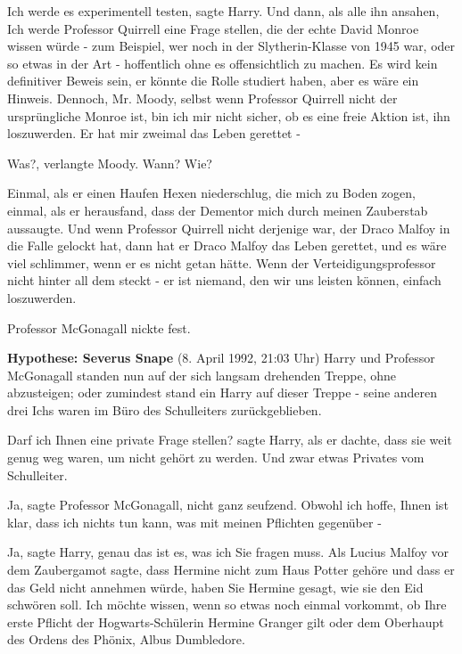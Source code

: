 \glqq{}Ich werde es experimentell testen\grqq{}, sagte Harry. Und dann, als alle
ihn ansahen, \glqq{}Ich werde Professor Quirrell eine Frage stellen, die der
echte David Monroe wissen würde - zum Beispiel, wer noch in der Slytherin-Klasse
von 1945 war, oder so etwas in der Art - hoffentlich ohne es offensichtlich zu
machen. Es wird kein definitiver Beweis sein, er könnte die Rolle studiert
haben, aber es wäre ein Hinweis. Dennoch, Mr. Moody, selbst wenn Professor
Quirrell nicht der ursprüngliche Monroe ist, bin ich mir nicht sicher, ob es
eine freie Aktion ist, ihn loszuwerden. Er hat mir zweimal das Leben gerettet
-\grqq{}

\glqq{}Was?\grqq{}, verlangte Moody. \glqq{}Wann? Wie?\grqq{}

\glqq{}Einmal, als er einen Haufen Hexen niederschlug, die mich zu Boden zogen,
einmal, als er herausfand, dass der Dementor mich durch meinen Zauberstab
aussaugte. Und wenn Professor Quirrell nicht derjenige war, der Draco Malfoy in
die Falle gelockt hat, dann hat er Draco Malfoy das Leben gerettet, und es wäre
viel schlimmer, wenn er es nicht getan hätte. Wenn der Verteidigungsprofessor
nicht hinter all dem steckt - er ist niemand, den wir uns leisten können,
einfach loszuwerden.\grqq{}

Professor McGonagall nickte fest.

\textbf{Hypothese: Severus Snape} (8. April 1992, 21:03 Uhr) Harry und Professor
McGonagall standen nun auf der sich langsam drehenden Treppe, ohne abzusteigen;
oder zumindest stand ein Harry auf dieser Treppe - seine anderen drei Ichs waren
im Büro des Schulleiters zurückgeblieben.

\glqq{}Darf ich Ihnen eine private Frage stellen?\grqq{} sagte Harry, als er
dachte, dass sie weit genug weg waren, um nicht gehört zu werden. \glqq{}Und zwar
etwas Privates vom Schulleiter.\grqq{}

\glqq{}Ja\grqq{}, sagte Professor McGonagall, nicht ganz seufzend. \glqq{}Obwohl
ich hoffe, Ihnen ist klar, dass ich nichts tun kann, was mit meinen Pflichten
gegenüber -\grqq{}

\glqq{}Ja\grqq{}, sagte Harry, \glqq{}genau das ist es, was ich Sie fragen muss.
Als Lucius Malfoy vor dem Zaubergamot sagte, dass Hermine nicht zum Haus Potter
gehöre und dass er das Geld nicht annehmen würde, haben Sie Hermine gesagt, wie
sie den Eid schwören soll. Ich möchte wissen, wenn so etwas noch einmal
vorkommt, ob Ihre erste Pflicht der Hogwarts-Schülerin Hermine Granger gilt oder
dem Oberhaupt des Ordens des Phönix, Albus Dumbledore.\grqq{}

